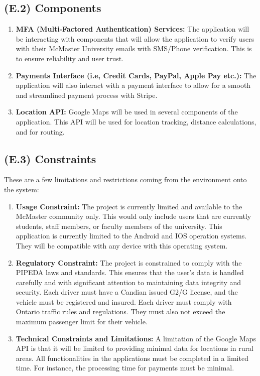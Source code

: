 \documentclass[12pt,letterpaper]{article}
\begin{document}
\subsection{(E.2) Components}
\begin{enumerate}
\item \textbf{MFA (Multi-Factored Authentication) Services:} The application will be interacting with components that will allow the application to verify users with their McMaster University emails with SMS/Phone verification. This is to ensure reliability and user trust.
\item \textbf{Payments Interface (i.e, Credit Cards, PayPal, Apple Pay etc.):} The application will also interact with a payment interface to allow for a smooth and streamlined payment process with Stripe. 
\item \textbf{Location API:} Google Maps will be used in several components of the application. This API will be used for location tracking, distance calculations, and for routing.
\end{enumerate}

\subsection{(E.3) Constraints}
These are a few limitations and restrictions coming from the environment onto the system: 
\begin{enumerate}
\item \textbf{Usage Constraint:} The project is currently limited and available to the McMaster community only. This would only include users that are currently students, staff members, or faculty members of the university. This application is currently limited to the Android and IOS operation systems. They will be compatible with any device with this operating system.
\item \textbf{Regulatory Constraint:} The project is constrained to comply with the PIPEDA laws and standards. This ensures that the user's data is handled carefully and with significant attention to maintaining data integrity and security. Each driver must have a Candian issued G2/G license, and the vehicle must be registered and insured. Each driver must comply with Ontario traffic rules and regulations. They must also not exceed the maximum passenger limit for their vehicle.
\item \textbf{Technical Constraints and Limitations:} A limitation of the Google Maps API is that it will be limited to providing minimal data for locations in rural areas. All functionalities in the applications must be completed in a limited time. For instance, the processing time for payments must be minimal. 
\end{enumerate}
\end{document}

